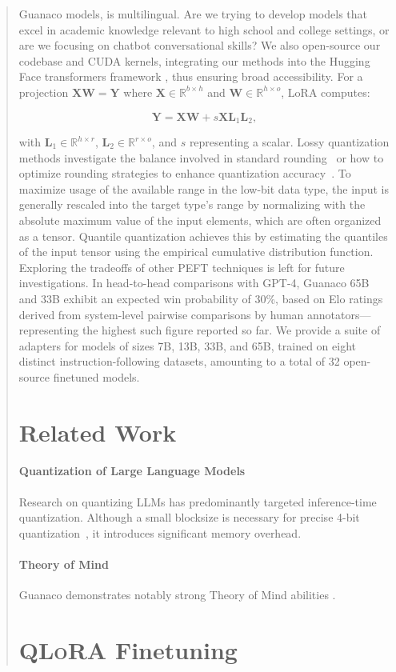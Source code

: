 \begin{quote}
{Guanaco} models, is multilingual. Are we trying to develop models that excel in academic knowledge relevant to high school and college settings, or are we focusing on chatbot conversational skills? We also open-source our codebase and CUDA kernels, integrating our methods into the Hugging Face transformers framework \citep{wolf2019huggingface}, thus ensuring broad accessibility. For a projection ${\mathbf{X} \mathbf{W} = \mathbf{Y}}$ where $\mathbf{X}\in \mathbb{R}^{b\times h}$ and $\mathbf{W}\in \mathbb{R}^{h\times o}$, LoRA computes:

\begin{equation}
    \mathbf{Y} = \mathbf{X}\mathbf{W} + s\mathbf{X}\mathbf{L}_1\mathbf{L}_2,
\end{equation}

with $\mathbf{L}_1\in \mathbb{R}^{h\times r}$, $\mathbf{L}_2\in \mathbb{R}^{r\times o}$, and $s$ representing a scalar. Lossy quantization methods investigate the balance involved in standard rounding~\citep{dettmers2022case,zeng2022glm,pope2022efficiently} or how to optimize rounding strategies to enhance quantization accuracy~\citep{frantar2022gptq}. To maximize usage of the available range in the low-bit data type, the input is generally rescaled into the target type’s range by normalizing with the absolute maximum value of the input elements, which are often organized as a tensor. Quantile quantization achieves this by estimating the quantiles of the input tensor using the empirical cumulative distribution function. Exploring the tradeoffs of other PEFT techniques is left for future investigations. In head-to-head comparisons with GPT-4, {Guanaco} 65B and 33B exhibit an expected win probability of 30\%, based on Elo ratings derived from system-level pairwise comparisons by human annotators—representing the highest such figure reported so far. We provide a suite of adapters for models of sizes 7B, 13B, 33B, and 65B, trained on eight distinct instruction-following datasets, amounting to a total of 32 open-source finetuned models. \section{Related Work}

\paragraph{Quantization of Large Language Models} Research on quantizing LLMs has predominantly targeted inference-time quantization. Although a small blocksize is necessary for precise 4-bit quantization~\citep{dettmers2022case}, it introduces significant memory overhead. \paragraph{Theory of Mind} {Guanaco} demonstrates notably strong Theory of Mind abilities \cite{nematzadeh2018evaluating, sap2022neural}. \section{\textsc{QLoRA} Finetuning}


\end{quote}
